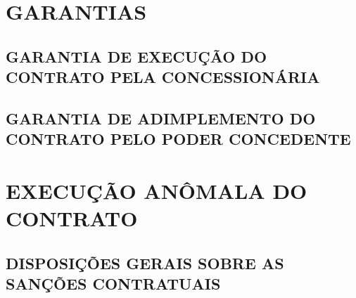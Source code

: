 \documentclass[a4paper,11pt]{report} %
\begin{document}
\chapter{GARANTIAS}
\section{GARANTIA DE EXECUÇÃO DO CONTRATO PELA CONCESSIONÁRIA}
\label{sec:CBKD}

\begin{enumerate}

\end{enumerate}

\section{GARANTIA DE ADIMPLEMENTO DO CONTRATO PELO PODER CONCEDENTE}
\label{sec:WYDY}
\begin{enumerate}
\end{enumerate}

\chapter{EXECUÇÃO ANÔMALA DO CONTRATO}
\section{DISPOSIÇÕES GERAIS SOBRE AS SANÇÕES CONTRATUAIS}
\label{sec:78Q7}
\end{document}
